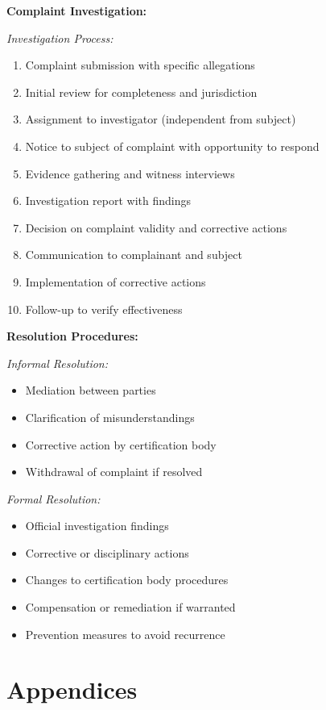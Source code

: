 \documentclass[11pt,a4paper]{article}
\begin{document}
\textbf{Complaint Investigation:}

\textit{Investigation Process:}
\begin{enumerate}
\item Complaint submission with specific allegations
\item Initial review for completeness and jurisdiction
\item Assignment to investigator (independent from subject)
\item Notice to subject of complaint with opportunity to respond
\item Evidence gathering and witness interviews
\item Investigation report with findings
\item Decision on complaint validity and corrective actions
\item Communication to complainant and subject
\item Implementation of corrective actions
\item Follow-up to verify effectiveness
\end{enumerate}

\textbf{Resolution Procedures:}

\textit{Informal Resolution:}
\begin{itemize}
\item Mediation between parties
\item Clarification of misunderstandings
\item Corrective action by certification body
\item Withdrawal of complaint if resolved
\end{itemize}

\textit{Formal Resolution:}
\begin{itemize}
\item Official investigation findings
\item Corrective or disciplinary actions
\item Changes to certification body procedures
\item Compensation or remediation if warranted
\item Prevention measures to avoid recurrence
\end{itemize}

\section*{Appendices}

\appendix
\end{document}
